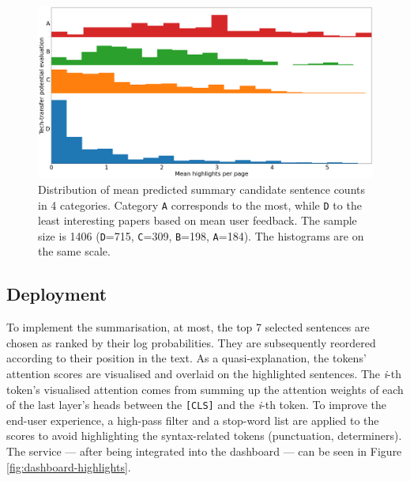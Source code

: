 \begin{figure}
    \centering
    \includegraphics[width=0.85\linewidth]{figures/highlights-histograms.png}
    \captionsetup{width=.9\linewidth}
    \caption{Distribution of mean predicted summary candidate sentence counts in 4 categories. Category \texttt{A} corresponds to the most, while \texttt{D} to the least interesting papers based on mean user feedback. The sample size is 1406 (\texttt{D}=715, \texttt{C}=309, \texttt{B}=198, \texttt{A}=184). The histograms are on the same scale.}
    \label{fig:histograms}
\end{figure}

\subsection{Deployment}

To implement the summarisation, at most, the top 7 selected sentences are chosen as ranked by their log probabilities. They are subsequently reordered according to their position in the text. As a quasi-explanation, the tokens' attention scores are visualised and overlaid on the highlighted sentences. The \textit{i}-th token's visualised attention comes from summing up the attention weights of each of the last layer's heads between the \texttt{[CLS]} and the \textit{i}-th token. To improve the end-user experience, a high-pass filter and a stop-word list are applied to the scores to avoid highlighting the syntax-related tokens (punctuation, determiners). The service --- after being integrated into the dashboard --- can be seen in Figure \ref{fig:dashboard-highlights}.

